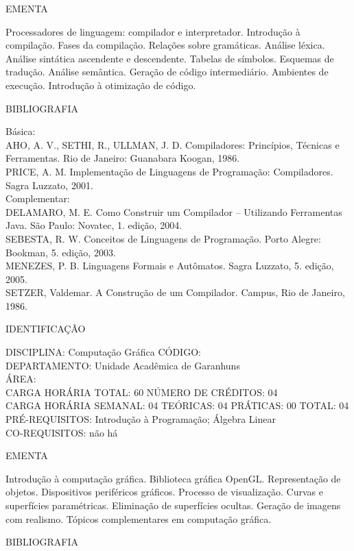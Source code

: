 \documentclass[
	12pt,				%
	openright,			%
  oneside,     %
	a4paper,			%
	chapter=TITLE,		%
	english,			%
	french,				%
	spanish,			%
	brazil				%
	]{abntex2}
\begin{document}
\begin{apendicesenv}
EMENTA 

Processadores de linguagem: compilador e interpretador. Introdução à
compilação. Fases da compilação. Relações sobre gramáticas. Análise
léxica. Análise sintática ascendente e descendente. Tabelas de
símbolos. Esquemas de tradução. Análise semântica. Geração de código
intermediário. Ambientes de execução. Introdução à otimização de
código.

BIBLIOGRAFIA 

Básica:\\
AHO, A. V., SETHI, R., ULLMAN, J. D. Compiladores: Princípios, Técnicas
e Ferramentas. Rio de Janeiro: Guanabara Koogan, 1986.\\
PRICE, A. M. Implementação de Linguagens de Programação: Compiladores.
Sagra Luzzato, 2001.\\
Complementar:\\
DELAMARO, M. E. Como Construir um Compilador -- Utilizando Ferramentas
Java. São Paulo: Novatec, 1. edição, 2004.\\
SEBESTA, R. W. Conceitos de Linguagens de Programação. Porto Alegre:
Bookman, 5. edição, 2003.\\
MENEZES, P. B. Linguagens Formais e Autômatos. Sagra Luzzato, 5. edição,
2005.\\
SETZER, Valdemar. A Construção de um Compilador. Campus, Rio de Janeiro, 1986.

\newpage IDENTIFICAÇÃO

DISCIPLINA: Computação Gráfica CÓDIGO:\\ 
DEPARTAMENTO: Unidade Acadêmica de Garanhuns\\
ÁREA: \\
CARGA HORÁRIA TOTAL: 60 NÚMERO DE CRÉDITOS: 04\\
CARGA HORÁRIA SEMANAL: 04 TEÓRICAS: 04 PRÁTICAS: 00 TOTAL: 04\\
PRÉ-REQUISITOS: Introdução à Programação; Álgebra Linear\\
CO-REQUISITOS: não há

EMENTA 

Introdução à computação gráfica. Biblioteca gráfica OpenGL.
Representação de objetos. Dispositivos periféricos gráficos. Processo
de visualização. Curvas e superfícies paramétricas. Eliminação de
superfícies ocultas. Geração de imagens com realismo. Tópicos
complementares em computação gráfica.

BIBLIOGRAFIA 


\end{apendicesenv}
\end{document}
